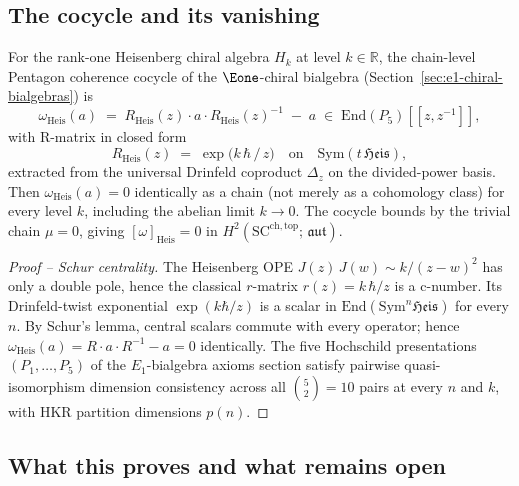 \subsection{The cocycle and its vanishing}
\label{subsec:heisenberg-pentagon-cocycle}

\begin{theorem}
\label{thm:heisenberg-pentagon-E1}
For the rank-one Heisenberg chiral algebra $H_k$ at level
$k \in \mathbb{R}$, the chain-level Pentagon coherence cocycle of
the $\Eone$-chiral bialgebra (Section~\ref{sec:e1-chiral-bialgebras}) is
\[
 \omega_{\mathrm{Heis}}(a) \;=\; R_{\mathrm{Heis}}(z) \cdot a \cdot
 R_{\mathrm{Heis}}(z)^{-1} \;-\; a
 \;\in\; \mathrm{End}(P_5)[\![z, z^{-1}]\!],
\]
with R-matrix in closed form
\[
 R_{\mathrm{Heis}}(z) \;=\; \exp\!\bigl(k\,\hbar\,/\,z\bigr)
 \quad\text{on}\quad \mathrm{Sym}(t\,\mathfrak{Heis}),
\]
extracted from the universal Drinfeld coproduct $\Delta_z$ on the
divided-power basis.
Then $\omega_{\mathrm{Heis}}(a) = 0$ identically as a chain (not
merely as a cohomology class) for every level $k$, including the
abelian limit $k \to 0$. The cocycle bounds by the trivial chain
$\mu = 0$, giving $[\omega]_{\mathrm{Heis}} = 0$ in
$H^2(\mathrm{SC}^{\mathrm{ch,top}};\, \mathfrak{aut})$.
\end{theorem}

\begin{proof}[Proof -- Schur centrality]
The Heisenberg OPE
$J(z)\,J(w) \sim k/(z - w)^2$
has only a double pole, hence the classical $r$-matrix
$r(z) = k\,\hbar/z$ is a c-number. Its Drinfeld-twist exponential
$\exp(k\hbar/z)$ is a scalar in
$\mathrm{End}(\mathrm{Sym}^n \mathfrak{Heis})$ for every $n$.
By Schur's lemma, central scalars commute with every operator; hence
$\omega_{\mathrm{Heis}}(a) = R \cdot a \cdot R^{-1} - a = 0$
identically. The five Hochschild presentations
$(P_1, \ldots, P_5)$ of the $E_1$-bialgebra axioms section
satisfy pairwise quasi-isomorphism dimension consistency across all
$\binom{5}{2} = 10$ pairs at every $n$ and $k$, with HKR partition
dimensions $p(n)$.
\end{proof}

\subsection{What this proves and what remains open}
\label{subsec:heisenberg-pentagon-scope}


